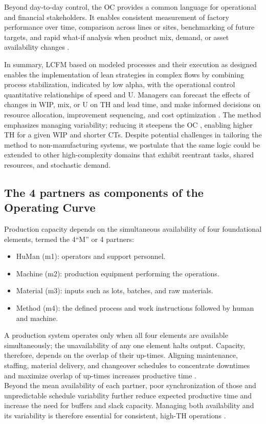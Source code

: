 \documentclass[preprint,12pt,authoryear]{elsarticle}
\begin{document}
Beyond day-to-day control, the OC provides a common language for operational and financial stakeholders. It enables consistent measurement of factory performance over time, comparison across lines or sites, benchmarking of future targets, and rapid what-if analysis when product mix, demand, or asset availability changes \citep{aurand1997operating}.\par
In summary, LCFM based on modeled processes and their execution as designed enables the implementation of lean strategies in complex flows by combining process stabilization, indicated by low alpha, with the operational control quantitative relationships of speed and U. Managers can forecast the effects of changes in WIP, mix, or U on TH and lead time, and make informed decisions on resource allocation, improvement sequencing, and cost optimization \citep{fayed2008, kalir2023optimizing}. The method emphasizes managing variability; reducing it steepens the OC \citep{hopp2001}, enabling higher TH for a given WIP and shorter CTs. Despite potential challenges in tailoring the method to non-manufacturing systems, we postulate that the same logic could be extended to other high-complexity domains that exhibit reentrant tasks, shared resources, and stochastic demand.     
            
    
\subsection{The 4 partners as components of the Operating Curve}\label{subsec:The 4 components of the Operating Curve}
Production capacity depends on the simultaneous availability of four foundational elements, termed the 4``M'' or 4 partners:
        \begin{itemize}
            \item HuMan (m1): operators and support personnel.
            \item Machine (m2): production equipment performing the operations.
            \item Material (m3): inputs such as lots, batches, and raw materials.
            \item Method (m4): the defined process and work instructions followed by human and machine.
        \end{itemize}
A production system operates only when all four elements are available simultaneously; the unavailability of any one element halts output. Capacity, therefore, depends on the overlap of their up-times. Aligning maintenance, staffing, material delivery, and changeover schedules to concentrate downtimes and maximize overlap of up-times increases productive time \citep{schoemig1999corrupting, ehm2011}.\\
Beyond the mean availability of each partner, poor synchronization of those and unpredictable schedule variability further reduce expected productive time and increase the need for buffers and slack capacity. Managing both availability and its variability is therefore essential for consistent, high-TH operations \citep{Schmielau2024}.
\end{document}
